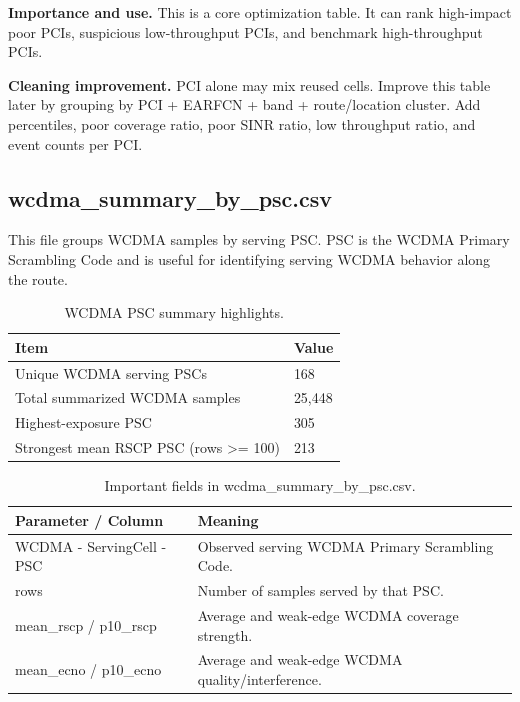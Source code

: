 \documentclass[12pt,a4paper]{article}
\begin{document}
\textbf{Importance and use.} This is a core optimization table. It can rank high-impact poor PCIs, suspicious low-throughput PCIs, and benchmark high-throughput PCIs.

\textbf{Cleaning improvement.} PCI alone may mix reused cells. Improve this table later by grouping by PCI + EARFCN + band + route/location cluster. Add percentiles, poor coverage ratio, poor SINR ratio, low throughput ratio, and event counts per PCI.


\subsection{wcdma\_summary\_by\_psc.csv}
This file groups WCDMA samples by serving PSC. PSC is the WCDMA Primary Scrambling Code and is useful for identifying serving WCDMA behavior along the route.


\begin{table}[H]
\centering
\begin{tabularx}{0.94\textwidth}{P{5.2cm}Y}
\toprule
\textbf{Item} & \textbf{Value} \\
\midrule
Unique WCDMA serving PSCs & 168 \\
Total summarized WCDMA samples & 25,448 \\
Highest-exposure PSC & 305 \\
Strongest mean RSCP PSC (rows >= 100) & 213 \\
\bottomrule
\end{tabularx}
\caption{WCDMA PSC summary highlights.}
\end{table}


\begin{table}[H]
\centering
\begin{tabularx}{\textwidth}{P{0.38\textwidth}Y}
\toprule
\textbf{Parameter / Column} & \textbf{Meaning} \\
\midrule
{\ttfamily WCDMA -\allowbreak{} ServingCell -\allowbreak{} PSC} & Observed serving WCDMA Primary Scrambling Code. \\
{\ttfamily rows} & Number of samples served by that PSC. \\
{\ttfamily mean\_\allowbreak{}rscp /\allowbreak{} p10\_\allowbreak{}rscp} & Average and weak-edge WCDMA coverage strength. \\
{\ttfamily mean\_\allowbreak{}ecno /\allowbreak{} p10\_\allowbreak{}ecno} & Average and weak-edge WCDMA quality/interference. \\
\bottomrule
\end{tabularx}
\caption{Important fields in wcdma\_summary\_by\_psc.csv.}
\end{table}
\end{document}
